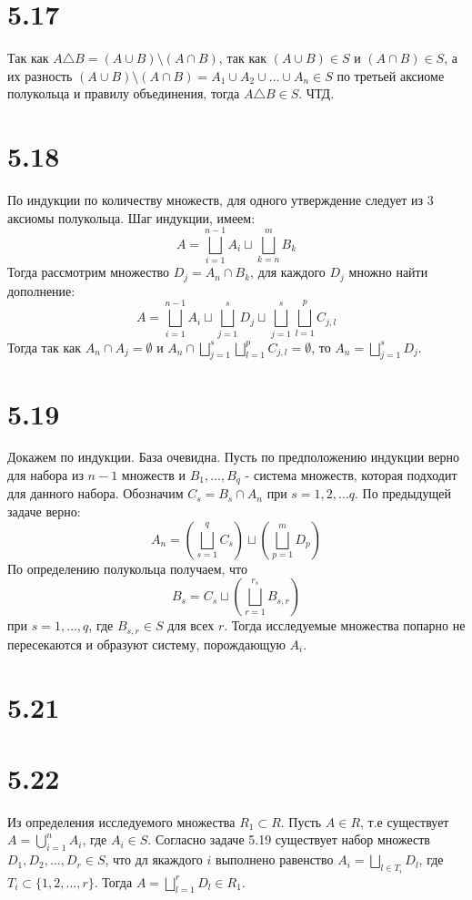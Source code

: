 \documentclass[12pt]{article}
\begin{document}
\section{5.17}
Так как $A \triangle B = (A \cup B) \setminus (A \cap B)$, так как $(A \cup B) \in S$ и $(A \cap B) \in S$,
а их разность $(A \cup B) \setminus (A \cap B) = A_1 \cup A_2 \cup \dots \cup A_n \in S$  по третьей аксиоме полукольца и правилу объединения, тогда $A \triangle B \in S$. ЧТД.
\section{5.18}
По индукции по количеству множеств, для одного утверждение следует из 3 аксиомы полукольца. Шаг индукции, имеем:
\[
    A = \bigsqcup_{i=1}^{n-1} A_i \sqcup \bigsqcup_{k=n}^{m} B_k
\]
Тогда рассмотрим множество $D_j = A_n \cap B_k$, для каждого $D_j$ множно найти дополнение:
\[
    A = \bigsqcup_{i=1}^{n-1} A_i \sqcup \bigsqcup_{j=1}^{s} D_j \sqcup \bigsqcup_{j=1}^{s} \bigsqcup_{l=1}^{p} C_{j, l}
\]
Тогда так как $A_n \cap A_j = \emptyset$ и $A_n \cap \bigsqcup_{j=1}^{s} \bigsqcup_{l=1}^{p} C_{j, l} = \emptyset$, то $A_n = \bigsqcup_{j=1}^{s} D_j$.
\section{5.19}
Докажем по индукции. База очевидна. Пусть по предположению индукции верно для набора из $n - 1$ множеств и 
$B_1, \dots , B_q$ - система множеств, которая подходит для данного набора. Обозначим $C_s = B_s \cap A_n$ при 
$s = 1, 2, \dots q.$ По предыдущей задаче верно: 
\[
    A_n = \left( \bigsqcup_{s=1}^q C_s \right) \sqcup \left( \bigsqcup_{p=1}^m D_p \right) 
\]    
По определению полукольца получаем, что 
\[
    B_s = C_s \sqcup \left( \bigsqcup_{r=1}^{r_s} B_{s, r}\right) 
\]
при $s = 1, \dots , q$, где $B_{s, r} \in S$ для всех $r$. Тогда исследуемые множества попарно не пересекаются и образуют систему, порождающую $A_i$.    
\section{5.21}
\section{5.22}
Из определения исследуемого множества $R_1 \subset R$. Пусть $A \in R$, т.е 
существует $A = \bigcup_{i=1}^{n} A_i$, где $A_i \in S$. Согласно задаче 5.19 
существует набор множеств $D_1, D_2, \dots, D_r \in S$, что дл якаждого $i$ выполнено равенство
$A_i = \bigsqcup_{l \in T_i} D_l$, где $T_i \subset \{1, 2, \dots, r\}$. Тогда $A = \bigsqcup_{l=1}^r D_l \in R_1$.         
\end{document}
